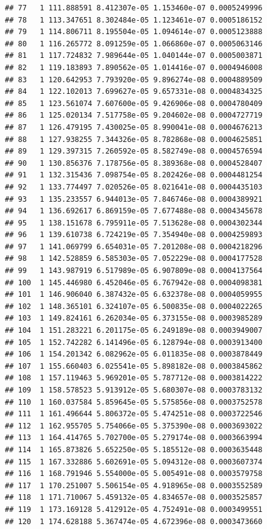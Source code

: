 \documentclass[article]{jss}\usepackage[]{graphicx}\usepackage[]{xcolor}
\makeatletter
\newenvironment{kframe}{%
 \def\at@end@of@kframe{}%
 \ifinner\ifhmode%
  \def\at@end@of@kframe{\end{minipage}}%
  \begin{minipage}{\columnwidth}%
 \fi\fi%
 \def\FrameCommand##1{\hskip\@totalleftmargin \hskip-\fboxsep
 \colorbox{shadecolor}{##1}\hskip-\fboxsep
     \hskip-\linewidth \hskip-\@totalleftmargin \hskip\columnwidth}%
 \MakeFramed {\advance\hsize-\width
   \@totalleftmargin\z@ \linewidth\hsize
   \@setminipage}}%
 {\par\unskip\endMakeFramed%
 \at@end@of@kframe}
\newenvironment{knitrout}{}{} %
\makeatother
\begin{document}
\begin{knitrout}
\begin{kframe}
\begin{verbatim}
## 77   1 111.888591 8.412307e-05 1.153460e-07 0.0005249996
## 78   1 113.347651 8.302484e-05 1.123461e-07 0.0005186152
## 79   1 114.806711 8.195504e-05 1.094614e-07 0.0005123888
## 80   1 116.265772 8.091259e-05 1.066860e-07 0.0005063146
## 81   1 117.724832 7.989644e-05 1.040144e-07 0.0005003871
## 82   1 119.183893 7.890562e-05 1.014416e-07 0.0004946008
## 83   1 120.642953 7.793920e-05 9.896274e-08 0.0004889509
## 84   1 122.102013 7.699627e-05 9.657331e-08 0.0004834325
## 85   1 123.561074 7.607600e-05 9.426906e-08 0.0004780409
## 86   1 125.020134 7.517758e-05 9.204602e-08 0.0004727719
## 87   1 126.479195 7.430025e-05 8.990041e-08 0.0004676213
## 88   1 127.938255 7.344326e-05 8.782868e-08 0.0004625851
## 89   1 129.397315 7.260592e-05 8.582749e-08 0.0004576594
## 90   1 130.856376 7.178756e-05 8.389368e-08 0.0004528407
## 91   1 132.315436 7.098754e-05 8.202426e-08 0.0004481254
## 92   1 133.774497 7.020526e-05 8.021641e-08 0.0004435103
## 93   1 135.233557 6.944013e-05 7.846746e-08 0.0004389921
## 94   1 136.692617 6.869159e-05 7.677488e-08 0.0004345678
## 95   1 138.151678 6.795911e-05 7.513628e-08 0.0004302344
## 96   1 139.610738 6.724219e-05 7.354940e-08 0.0004259893
## 97   1 141.069799 6.654031e-05 7.201208e-08 0.0004218296
## 98   1 142.528859 6.585303e-05 7.052229e-08 0.0004177528
## 99   1 143.987919 6.517989e-05 6.907809e-08 0.0004137564
## 100  1 145.446980 6.452046e-05 6.767942e-08 0.0004098381
## 101  1 146.906040 6.387432e-05 6.632378e-08 0.0004059955
## 102  1 148.365101 6.324107e-05 6.500835e-08 0.0004022265
## 103  1 149.824161 6.262034e-05 6.373155e-08 0.0003985289
## 104  1 151.283221 6.201175e-05 6.249189e-08 0.0003949007
## 105  1 152.742282 6.141496e-05 6.128794e-08 0.0003913400
## 106  1 154.201342 6.082962e-05 6.011835e-08 0.0003878449
## 107  1 155.660403 6.025541e-05 5.898182e-08 0.0003845862
## 108  1 157.119463 5.969201e-05 5.787712e-08 0.0003814222
## 109  1 158.578523 5.913912e-05 5.680307e-08 0.0003783132
## 110  1 160.037584 5.859645e-05 5.575856e-08 0.0003752578
## 111  1 161.496644 5.806372e-05 5.474251e-08 0.0003722546
## 112  1 162.955705 5.754066e-05 5.375390e-08 0.0003693022
## 113  1 164.414765 5.702700e-05 5.279174e-08 0.0003663994
## 114  1 165.873826 5.652250e-05 5.185512e-08 0.0003635448
## 115  1 167.332886 5.602691e-05 5.094312e-08 0.0003607374
## 116  1 168.791946 5.554000e-05 5.005491e-08 0.0003579758
## 117  1 170.251007 5.506154e-05 4.918965e-08 0.0003552589
## 118  1 171.710067 5.459132e-05 4.834657e-08 0.0003525857
## 119  1 173.169128 5.412912e-05 4.752491e-08 0.0003499551
## 120  1 174.628188 5.367474e-05 4.672396e-08 0.0003473660

\end{verbatim}
\end{kframe}
\end{knitrout}
\end{document}
